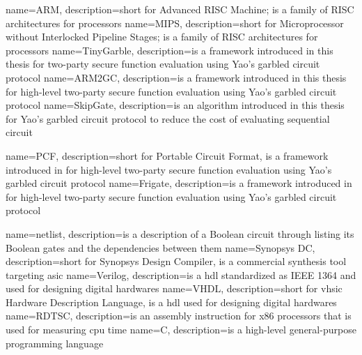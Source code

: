 {
  name=ARM,
  description={short for Advanced RISC Machine; is a family of RISC architectures for processors}
}
{
  name=MIPS,
  description={short for Microprocessor without Interlocked Pipeline Stages; is a family of RISC architectures for processors}
}
{
  name=TinyGarble,
  description={is a framework introduced in this thesis for two-party secure function evaluation using Yao's garbled circuit protocol}
}
{
  name=ARM2GC,
  description={is a framework introduced in this thesis for high-level two-party secure function evaluation using Yao's garbled circuit protocol}
}
{
  name=SkipGate,
  description={is an algorithm introduced in this thesis for Yao's garbled circuit protocol to reduce the cost of evaluating sequential circuit}
}

{
  name=PCF,
  description={short for Portable Circuit Format, is a framework introduced in \cite{kreuter2013pcf} for high-level two-party secure function evaluation using Yao's garbled circuit protocol}
}
{
  name=Frigate,
  description={is a framework introduced in \cite{mood2016frigate} for high-level two-party secure function evaluation using Yao's garbled circuit protocol}
}

{
  name=netlist,
  description={is a description of a Boolean circuit through listing its Boolean gates and the dependencies between them}
}
{
  name=Synopsys DC,
  description={short for Synopsys Design Compiler, is a commercial synthesis tool targeting \acrfull{asic}}
}
{
  name=Verilog,
  description={is a \acrfull{hdl} standardized as IEEE 1364 and used for designing digital hardwares}
}
{
  name=VHDL,
  description={short for \acrshort{vhsic} Hardware Description Language, is a \acrfull{hdl} used for designing digital hardwares}
}
{
  name=RDTSC,
  description={is an assembly instruction for x86 processors that is used for measuring \acrshort{cpu} time}
}
{
  name=C,
  description={is a high-level general-purpose programming language}
}
